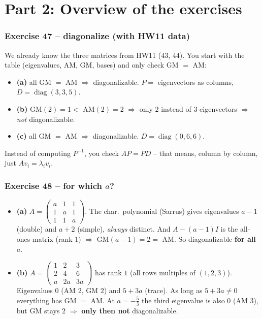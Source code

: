 \documentclass[a4paper,12pt]{article}
\begin{document}
\newpage

\part*{Part 2: Overview of the exercises}

\section*{Exercise 47 -- diagonalize (with HW11 data)}

We already know the three matrices from HW11 (43, 44). You start with the table (eigenvalues, AM, GM, bases) and only check GM $=$ AM:
\begin{itemize}[leftmargin=*, nosep]
    \item \textbf{(a)} all GM $=$ AM $\Rightarrow$ diagonalizable. $P =$ eigenvectors as columns, $D = \operatorname{diag}(3,3,5)$.
    \item \textbf{(b)} GM$(2) = 1 <$ AM$(2) = 2$ $\Rightarrow$ only $2$ instead of $3$ eigenvectors $\Rightarrow$ \emph{not} diagonalizable.
    \item \textbf{(c)} all GM $=$ AM $\Rightarrow$ diagonalizable. $D = \operatorname{diag}(0,6,6)$.
\end{itemize}
Instead of computing $P^{-1}$, you check $AP = PD$ -- that means, column by column, just $A v_i = \lambda_i v_i$.

\section*{Exercise 48 -- for which $a$?}

\begin{itemize}[leftmargin=*, nosep]
    \item \textbf{(a)} $A = \left(\begin{smallmatrix} a&1&1\\1&a&1\\1&1&a \end{smallmatrix}\right)$. The char.\ polynomial (Sarrus) gives eigenvalues $a-1$ (double) and $a+2$ (simple), \emph{always} distinct. And $A - (a-1)I$ is the all-ones matrix (rank $1$) $\Rightarrow$ GM$(a-1) = 2 =$ AM. So diagonalizable \textbf{for all $a$}.
    \item \textbf{(b)} $A = \left(\begin{smallmatrix} 1&2&3\\2&4&6\\a&2a&3a \end{smallmatrix}\right)$ has rank $1$ (all rows multiples of $(1,2,3)$). Eigenvalues $0$ (AM $2$, GM $2$) and $5+3a$ (trace). As long as $5+3a \neq 0$ everything has GM $=$ AM. At $a = -\tfrac{5}{3}$ the third eigenvalue is also $0$ (AM $3$), but GM stays $2$ $\Rightarrow$ \textbf{only then not} diagonalizable.
\end{itemize}
\end{document}
